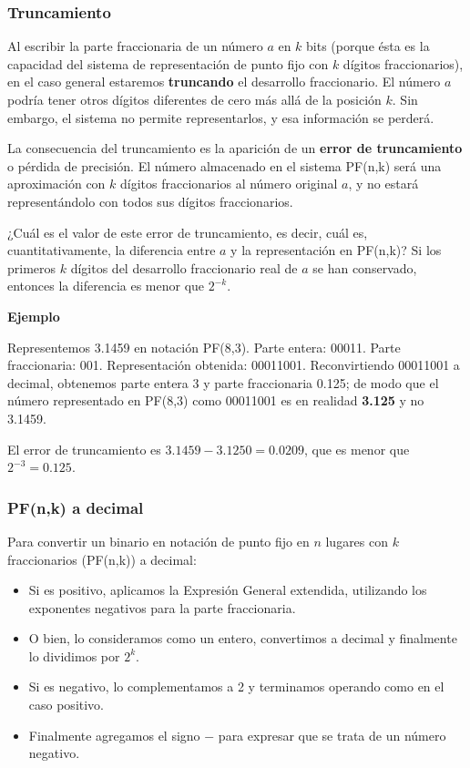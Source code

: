 \documentclass[spanish,A4,]{article}
\begin{document}
\subsubsection{Truncamiento}\label{truncamiento}

Al escribir la parte fraccionaria de un número $a$ en $k$ bits (porque
ésta es la capacidad del sistema de representación de punto fijo con $k$
dígitos fraccionarios), en el caso general estaremos \textbf{truncando}
el desarrollo fraccionario. El número $a$ podría tener otros dígitos
diferentes de cero más allá de la posición $k$. Sin embargo, el sistema
no permite representarlos, y esa información se perderá.

La consecuencia del truncamiento es la aparición de un \textbf{error de
truncamiento} o pérdida de precisión. El número almacenado en el sistema
PF(n,k) será una aproximación con $k$ dígitos fraccionarios al número
original $a$, y no estará representándolo con todos sus dígitos
fraccionarios.

¿Cuál es el valor de este error de truncamiento, es decir, cuál es,
cuantitativamente, la diferencia entre $a$ y la representación en
PF(n,k)? Si los primeros $k$ dígitos del desarrollo fraccionario real de
$a$ se han conservado, entonces la diferencia es menor que $2^{-k}$.

\textbf{Ejemplo}

Representemos 3.1459 en notación PF(8,3). Parte entera: 00011. Parte
fraccionaria: 001. Representación obtenida: 00011001. Reconvirtiendo
00011001 a decimal, obtenemos parte entera 3 y parte fraccionaria 0.125;
de modo que el número representado en PF(8,3) como 00011001 es en
realidad \textbf{3.125} y no 3.1459.

El error de truncamiento es $3.1459 - 3.1250 = 0.0209$, que es menor que
$2^{-3} = 0.125$.

\subsubsection{PF(n,k) a decimal}\label{pfnk-a-decimal}

Para convertir un binario en notación de punto fijo en $n$ lugares con
$k$ fraccionarios (PF(n,k)) a decimal:

\begin{itemize}
\itemsep1pt\parskip0pt
\item
  Si es positivo, aplicamos la Expresión General extendida, utilizando
  los exponentes negativos para la parte fraccionaria.
\item
  O bien, lo consideramos como un entero, convertimos a decimal y
  finalmente lo dividimos por $2^k$.
\item
  Si es negativo, lo complementamos a 2 y terminamos operando como en el
  caso positivo.
\item
  Finalmente agregamos el signo $-$ para expresar que se trata de un
  número negativo.
\end{itemize}
\end{document}
